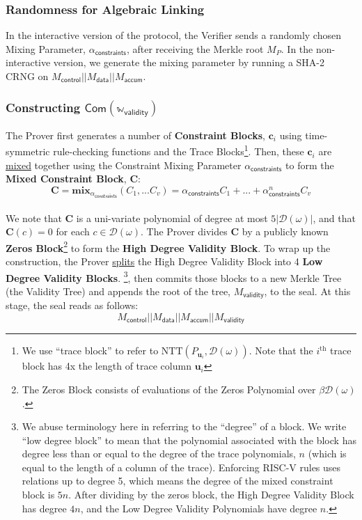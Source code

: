 \documentclass[10pt,letterpaper,titlepage]{article}
\newcommand{\w}[0]{\omega}
\newcommand{\D}[0]{\mathcal{D}}
\theoremstyle{definition}
\begin{document}
\begin{appendices}
\subsubsection{Randomness for Algebraic Linking}
\label{constraint mixing parameter}
In the interactive version of the protocol, the Verifier sends a randomly chosen Mixing Parameter, $\alpha_\mathsf{constraints}$, after receiving the Merkle root $M_{P}$.
In the non-interactive version, we generate the mixing parameter by running a SHA-2 CRNG on
$
  M_\mathsf{control}||
  M_\mathsf{data}||
  M_\mathsf{accum}
$.

\subsubsection{Constructing $\mathsf{Com}(\mathbb{w}_\mathsf{validity})$}
\label{committing validity polynomials}
The Prover first generates a number of \textbf{Constraint Blocks}, $\mathbf{c}_i$ using time-symmetric rule-checking functions and the Trace Blocks\footnote{We use ``trace block'' to refer to $\text{NTT}(P_{\mathbf{u}_i},\D(\w))$.
Note that the $i^\text{th}$ trace block has 4x the length of trace column $\mathbf{u}_i$}.
Then, these $\mathbf{c}_i$ are \hyperref[mix]{mixed} together using the Constraint Mixing Parameter $\alpha_\mathsf{constraints}$ to form the \textbf{Mixed Constraint Block}, $\mathbf{C}$:
\[\mathbf{C}=\textbf{mix}_{\alpha_\mathsf{constraints}}(C_1,...C_v)=\alpha_\mathsf{constraints} C_1 + ... + \alpha_\mathsf{constraints}^n C_v\]\\
We note that $\mathbf{C}$ is a uni-variate polynomial of degree at most $5|\D(\w)|$, and that $\mathbf{C}(c)=0$ for each $c\in\D(\w)$.
The Prover divides $\mathbf{C}$ by a publicly known \textbf{Zeros Block}\footnote{The Zeros Block consists of evaluations of the Zeros Polynomial over $\beta\D(\w)$.} to form the \textbf{High Degree Validity Block}.
To wrap up the construction, the Prover \hyperref[split]{splits} the High Degree Validity Block into 4 \textbf{Low Degree Validity Blocks}.%
\footnote{We abuse terminology here in referring to the ``degree'' of a block.
We write ``low degree block'' to mean that the polynomial associated with the block has degree less than or equal to the degree of the trace polynomials, $n$  (which is equal to the length of a column of the trace).
Enforcing RISC-V rules uses relations up to degree 5, which means the degree of the mixed constraint block is $5n$.
After dividing by the zeros block, the High Degree Validity Block has degree $4n$, and the Low Degree Validity Polynomials have degree $n$.}, then commits those blocks to a new Merkle Tree (the Validity Tree) and appends the root of the tree, $M_\mathsf{validity}$, to the seal.
At this stage, the seal reads as follows:
\[
  M_\mathsf{control}||
  M_\mathsf{data}||
  M_\mathsf{accum}||
  M_\mathsf{validity}
\]


\end{appendices}
\end{document}
